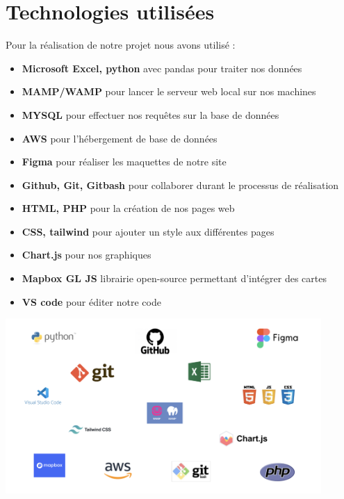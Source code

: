 \documentclass[12pt,a4paper]{report}
\begin{document}
\section{Technologies utilisées}
Pour la réalisation de notre projet nous avons utilisé :
\begin{itemize}
    \item \textbf{Microsoft Excel, python} avec pandas pour traiter nos données
    \item \textbf{MAMP/WAMP} pour lancer le serveur web local sur nos machines
    \item \textbf{MYSQL} pour effectuer nos requêtes sur la base de données
    \item \textbf{AWS} pour l'hébergement de base de données 
    \item \textbf{Figma} pour réaliser les maquettes de notre site
    \item \textbf{Github, Git, Gitbash} pour collaborer durant le processus de réalisation
    \item \textbf{HTML, PHP} pour la création de nos pages web
    \item \textbf{CSS, tailwind} pour ajouter un style aux différentes pages
    \item \textbf{Chart.js} pour nos graphiques
    \item \textbf{Mapbox GL JS} librairie open-source permettant d'intégrer des cartes 
    \item \textbf{VS code} pour éditer notre code
\end{itemize}
    \begin{center}
        \includegraphics[width=0.9\textwidth]{images/technologies.png}
    \end{center}
\end{document}
